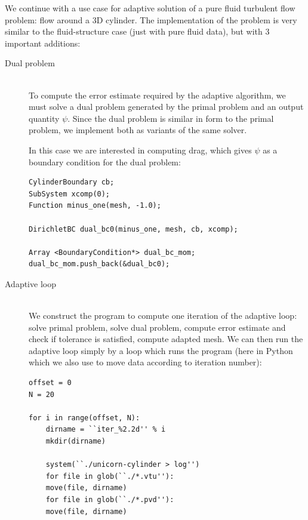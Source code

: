 We continue with a use case for adaptive solution of a pure fluid
turbulent flow problem: flow around a 3D cylinder. The implementation
of the problem is very similar to the fluid-structure case (just with
pure fluid data), but with 3 important additions:
\begin{description}
\item[Dual problem]
\ \\
To compute the error estimate required by the adaptive algorithm, we
must solve a dual problem generated by the primal problem and an
output quantity $\psi$. Since the dual problem is similar in form to
the primal problem, we implement both as variants of the same solver.

In this case we are interested in computing drag, which gives $\psi$
as a boundary condition for the dual problem:

\begin{lstlisting}
CylinderBoundary cb;
SubSystem xcomp(0);
Function minus_one(mesh, -1.0);

DirichletBC dual_bc0(minus_one, mesh, cb, xcomp);

Array <BoundaryCondition*> dual_bc_mom;
dual_bc_mom.push_back(&dual_bc0);
\end{lstlisting}


\item[Adaptive loop]
\ \\
We construct the program to compute one iteration of the adaptive
loop: solve primal problem, solve dual problem, compute error estimate
and check if tolerance is satisfied, compute adapted mesh. We can then
run the adaptive loop simply by a loop which runs the program (here in
Python which we also use to move data according to iteration number):


\begin{lstlisting}
offset = 0
N = 20

for i in range(offset, N):
    dirname = ``iter_%2.2d'' % i
    mkdir(dirname)

    system(``./unicorn-cylinder > log'')
    for file in glob(``./*.vtu''):
    move(file, dirname)
    for file in glob(``./*.pvd''):
    move(file, dirname)
\end{lstlisting}


\end{description}
